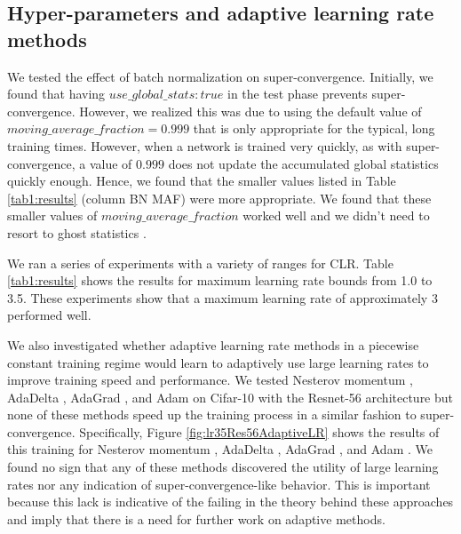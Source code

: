 \documentclass{article}
\begin{document}
	
	\subsection{Hyper-parameters and adaptive learning rate methods}
	\label{sec:HP}
	
	We tested the effect of batch normalization on super-convergence.
	Initially, we found that having $ use\_global\_stats: true $ in the test phase prevents super-convergence.
	However, we realized this was due to using the default value of $ moving\_average\_fraction = 0.999 $ that is only appropriate for the typical, long training times. 
	However, when a network is trained very quickly, as with super-convergence,  a value of $ 0.999 $ does not update the accumulated global statistics quickly enough.
	Hence, we found that the smaller values listed in Table \ref{tab1:results} (column BN MAF) were more appropriate.
	We found that these smaller values of $ moving\_average\_fraction$ worked well and we didn't need to resort to ghost statistics \citep{hoffer2017train}.
	
	
	We ran a series of experiments with a variety of ranges for CLR.
	Table \ref{tab1:results} shows the results for maximum learning rate bounds from 1.0 to 3.5.
	These experiments show that a maximum learning rate of approximately 3 performed well.
	
	We also investigated whether adaptive learning rate methods in a piecewise constant training regime would learn to adaptively use large learning rates to improve training speed and performance.
	We tested  Nesterov momentum \citep{sutskever2013importance,nesterov1983method}, AdaDelta \citep{duchi2011adaptive}, AdaGrad \citep{zeiler2012adadelta}, and Adam \citep{kingma2014adam} on Cifar-10 with the Resnet-56 architecture but none of these methods speed up the training process in a similar fashion to super-convergence.
	Specifically, Figure \ref{fig:lr35Res56AdaptiveLR} shows the results of this training for Nesterov momentum \citep{sutskever2013importance,nesterov1983method}, AdaDelta \citep{duchi2011adaptive}, AdaGrad \citep{zeiler2012adadelta}, and Adam \citep{kingma2014adam}.
	We found no sign that any of these methods discovered the utility of large learning rates nor any indication of super-convergence-like behavior.
	This is important because this lack is indicative of the failing in the theory behind these approaches and imply that there is a need for further work on adaptive methods.
	
\end{document}
